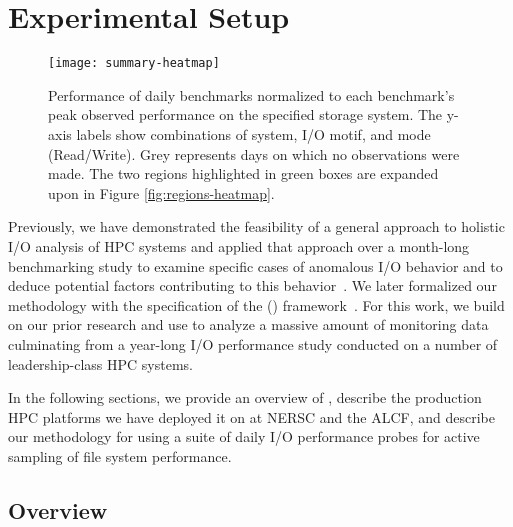 \section{Experimental Setup}\label{sec:methods}

\begin{figure*}[t]
    \centering
    \texttt{[image: summary-heatmap]}
    \vspace{-.2in}
    \caption{Performance of daily benchmarks normalized to each benchmark's peak observed performance on the specified storage system.  The y-axis labels show combinations of system, I/O motif, and mode (Read/Write).  Grey represents days on which no observations were made.  The two regions highlighted in green boxes are expanded upon in Figure \ref{fig:regions-heatmap}.}
    \label{fig:summary-heatmap}
\end{figure*}



Previously, we have demonstrated the feasibility of a general approach to holistic I/O analysis of HPC systems and applied that approach over a month-long benchmarking study to examine specific cases of anomalous I/O behavior and to deduce potential factors contributing to this behavior~\cite{Lockwood2017}. We later formalized our methodology with the specification of the \tokio (\tokiolong) framework~\cite{Lockwood2018tokio}. For this work, we build on our prior research and use \tokio to analyze a massive amount of monitoring data culminating from a year-long I/O performance study conducted on a number of leadership-class HPC systems. 

In the following sections, we provide an overview of \tokio, describe the production HPC platforms we have deployed it on at NERSC and the ALCF, and describe our methodology for using a suite of daily I/O performance probes for active sampling of file system performance.

\subsection{\tokio Overview}\label{sec:methods/tokio}


